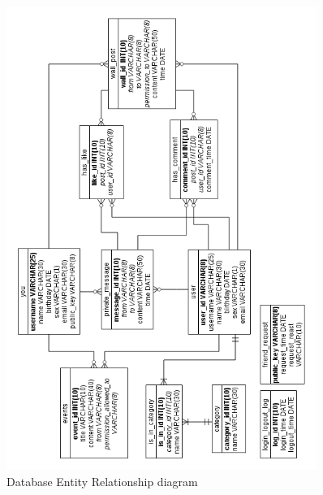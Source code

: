 \begin{figure}[h]
    \centering
    \includegraphics[width=0.9\textwidth]{images/design/project_er_diagram.png}
    \caption{Database Entity Relationship diagram}
    \label{fig:db_er_diag}
\end{figure}
